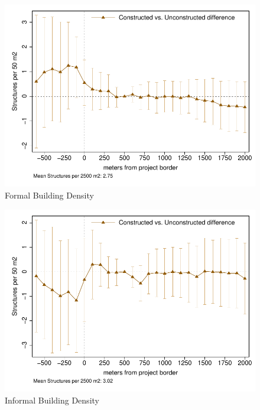 \documentclass[12pt]{article}
\begin{document}
\begin{figure}
\caption{Formal Building Density}\label{figure:dddformal}
\centering
\includegraphics[scale=.8]{figures/distplotDDD_bblu_for_admin.pdf}
\end{figure}
\begin{figure}
\caption{Informal Building Density}\label{figure:dddinformal}
\centering
\includegraphics[scale=.8]{figures/distplotDDD_bblu_inf_admin.pdf}
\end{figure}
\end{document}
